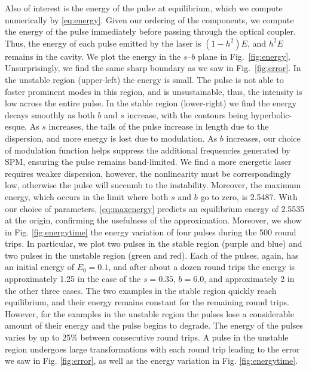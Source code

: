\documentclass[9pt,twocolumn,twoside]{osajnl}
\begin{document}
Also of interest is the energy of the pulse at equilibrium, which we compute numerically by \eqref{eq:energy}. Given our ordering of the components, we compute the energy of the pulse immediately before passing through the optical coupler. Thus, the energy of each pulse emitted by the laser is $(1 - h^2) E$, and $h^2 E$ remains in the cavity. We plot the energy in the $s$--$b$ plane in Fig.~\ref{fig:energy}. Unsurprisingly, we find the same sharp boundary as we saw in Fig.~\ref{fig:error}. In the unstable region (upper-left) the energy is small. The pulse is not able to foster prominent modes in this region, and is unsustainable, thus, the intensity is low across the entire pulse. In the stable region (lower-right) we find the energy decays smoothly as both $b$ and $s$ increase, with the contours being hyperbolic-esque. As $s$ increases, the tails of the pulse increase in length due to the dispersion, and more energy is lost due to modulation. As $b$ increases, our choice of modulation function helps suppress the additional frequencies generated by SPM, ensuring the pulse remains band-limited. We find a more energetic laser requires weaker dispersion, however, the nonlinearity must be correspondingly low, otherwise the pulse will succumb to the instability. Moreover, the maximum energy, which occurs in the limit where both $s$ and $b$ go to zero, is 2.5487. With our choice of parameters, \eqref{eq:maxenergy} predicts an equilibrium energy of 2.5535 at the origin, confirming the usefulness of the approximation. Moreover, we show in Fig. \ref{fig:energytime} the energy variation of four pulses during the 500 round trips. In particular, we plot two pulses in the stable region (purple and blue) and two pulses in the unstable region (green and red). Each of the pulses, again, has an initial energy of $E_0 = 0.1$, and after about a dozen round trips the energy is approximately 1.25 in the case of the $s = 0.35$, $b = 6.0$, and approximately 2 in the other three cases. The two examples in the stable region quickly reach equilibrium, and their energy remains constant for the remaining round trips. However, for the examples in the unstable region the pulses lose a considerable amount of their energy and the pulse begins to degrade. The energy of the pulses varies by up to 25\% between consecutive round trips. A pulse in the unstable region undergoes large transformations with each round trip leading to the error we saw in Fig. \ref{fig:error}, as well as the energy variation in Fig. \ref{fig:energytime}.
\end{document}
